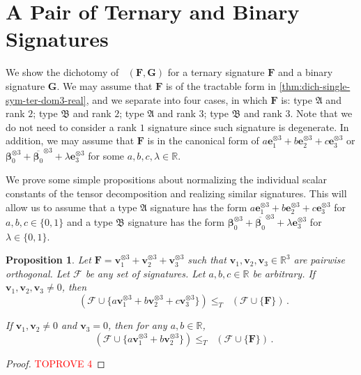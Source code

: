 \documentclass[11pt]{article}
\newtheorem{proposition}[theorem]{Proposition}
\DeclareMathOperator{\holts}{Holant^*_3}
\newcommand{\teh}{^{\otimes 3}}
\newcommand{\ternarytractgeneq}{$\mathfrak{A}$\xspace}
\newcommand{\ternarytractz}{$\mathfrak{B}$\xspace}
\begin{document}
\section{A Pair of Ternary and Binary Signatures}\label{sec:single-ternary-signle-binary}
We show the dichotomy of $\holts(\mathbf{F}, \mathbf{G})$ for a ternary signature $\mathbf{F}$ and a binary signature $\mathbf{G}$.
We may assume that $\mathbf{F}$ is of the tractable form in \cref{thm:dich-single-sym-ter-dom3-real}, and we separate into four cases, in which $\mathbf{F}$ is: type \ternarytractgeneq and rank $2$; type \ternarytractz and rank $2$; type \ternarytractgeneq and rank $3$; type \ternarytractz and rank $3$.
Note that we do not need to consider a rank $1$ signature since such signature is degenerate.
In addition, we may assume that $\mathbf{F}$ is in the canonical form of $a \mathbf{e}_1 \teh + b \mathbf{e}_2 \teh + c \mathbf{e}_3 \teh$ or $\boldsymbol{\beta}_0\teh + \overline{\boldsymbol{\beta}_0}\teh + \lambda \mathbf{e}_3 \teh$ for some $a, b, c, \lambda \in \mathbb{R}$.

We prove some simple propositions about normalizing the individual scalar constants of the tensor decomposition and realizing similar signatures. 
This will allow us to assume that a type \ternarytractgeneq signature has the form $a \mathbf{e}_1\teh + b \mathbf{e}_2 \teh + c \mathbf{e}_3\teh$ for $a, b, c \in \{0, 1\}$ and a type \ternarytractz signature has the form $\boldsymbol{\beta}_0\teh + \overline{\boldsymbol{\beta}_0}\teh + \lambda \mathbf{e}_3 \teh$ for $\lambda \in \{0, 1\}$.
\begin{proposition}\label{lem:geneq-normalization}
  Let $\mathbf{F} = \mathbf{v}_1\teh + \mathbf{v}_2 \teh + \mathbf{v}_3 \teh$ such that $\mathbf{v}_1, \mathbf{v}_2, \mathbf{v}_3 \in \mathbb{R}^3$ are pairwise orthogonal.
  Let $\mathcal{F}$ be any set of signatures.
  Let $a, b, c \in \mathbb{R}$ be arbitrary.
  If $\mathbf{v}_1, \mathbf{v}_2, \mathbf{v}_3 \ne 0$, then 
  \[
    \holts(\mathcal{F} \cup \{a \mathbf{v}_1\teh + b\mathbf{v}_2 \teh + c \mathbf{v}_3 \teh\}) \le_T \holts(\mathcal{F} \cup \{ \mathbf{F} \}) \, .
  \]

  If $\mathbf{v}_1, \mathbf{v}_2 \ne 0$ and $\mathbf{v}_3 = 0$, then for any $a, b \in \mathbb{R}$,
  \[
    \holts(\mathcal{F} \cup \{a \mathbf{v}_1\teh + b \mathbf{v}_2 \teh\}) \le_T \holts(\mathcal{F}  \cup \{ \mathbf{F} \}) \, .
  \]
\end{proposition}
\begin{proof}\textcolor{red}{TOPROVE 4}\end{proof}
\end{document}
